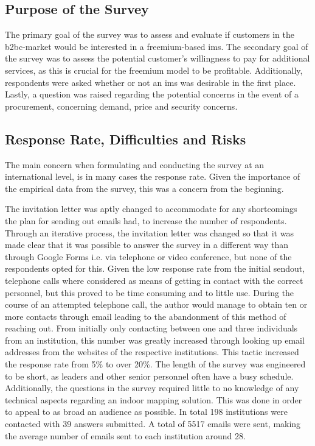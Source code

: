 \subsection{Purpose of the Survey}
The primary goal of the survey was to assess and evaluate if customers in the \gls{b2bc}-market would be interested in a freemium-based \gls{ims}. The secondary goal of the survey was to assess the potential customer's willingness to pay for additional services, as this is crucial for the freemium model to be profitable. Additionally, respondents were asked whether or not an \gls{ims} was desirable in the first place. Lastly, a question was raised regarding the potential concerns in the event of a procurement, concerning demand, price and security concerns.

\subsection{Response Rate, Difficulties and Risks}
The main concern when formulating and conducting the survey at an international level, is in many cases the response rate. Given the importance of the empirical data from the survey, this was a concern from the beginning. 


The invitation letter was aptly changed to accommodate for any shortcomings the plan for sending out emails had, to increase the number of respondents. Through an iterative process, the invitation letter was changed so that it was made clear that it was possible to answer the survey in a different way than through Google Forms i.e. via telephone or video conference, but none of the respondents opted for this. Given the low response rate from the initial sendout, telephone calls where considered as means of getting in contact with the correct personnel, but this proved to be time consuming and to little use. During the course of an attempted telephone call, the author would manage to obtain ten or more contacts through email leading to the abandonment of this method of reaching out. From initially only contacting between one and three individuals from an institution, this number was greatly increased through looking up email addresses from the websites of the respective institutions. This tactic increased the response rate from 5\% to over 20\%.  The length of the survey was engineered to be short, as leaders and other senior personnel often have a busy schedule. Additionally, the questions in the survey required little to no knowledge of any technical aspects regarding an indoor mapping solution. This was done in order to appeal to as broad an audience as possible. In total 198 institutions were contacted with 39 answers submitted. A total of 5517 emails were sent, making the average number of emails sent to each institution around 28. 


